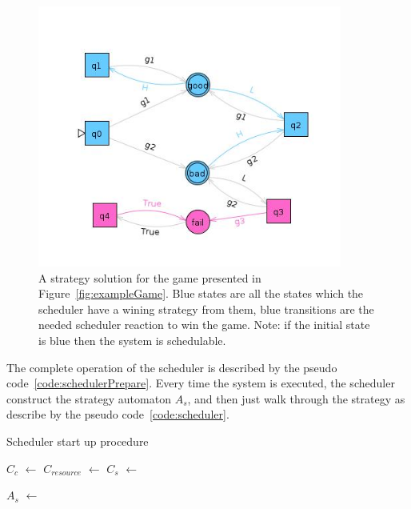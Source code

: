 \documentclass[ twoside, 12pt ]{article}
\begin{document}
\begin{figure}[h]
    \centerline{\includegraphics[width=100mm]{gameExampleSolved.jpg}}
    \caption{A strategy solution for the game presented in Figure~\ref{fig:exampleGame}.
        Blue states are all the states which the scheduler have a wining strategy from them, blue transitions are the needed scheduler reaction to win the game.
        Note: if the initial state is blue then the system is schedulable.}
    \label{fig:exampleGameStrategy}
\end{figure}

The complete operation of the scheduler is described by the pseudo code~\ref{code:schedulerPrepare}.
Every time the system is executed, the scheduler construct the strategy automaton $A_s$, and then just walk through the strategy as describe by the pseudo code~\ref{code:scheduler}. 


\begin{algorithm}[h]
    \caption{Scheduler start up procedure}
    \begin{algorithmic}[1]
         
        
        \State $C_c$ $\gets$ 
        \State $C_{resource}$ $\gets$ 
        \State $C_s$ $\gets$ 
        
        \State $A_s$ $\gets$ 
        
        \State {}  
        \EndIf
        
        \EndProcedure
    \end{algorithmic}
    \label{code:schedulerPrepare}
\end{algorithm}
\end{document}
